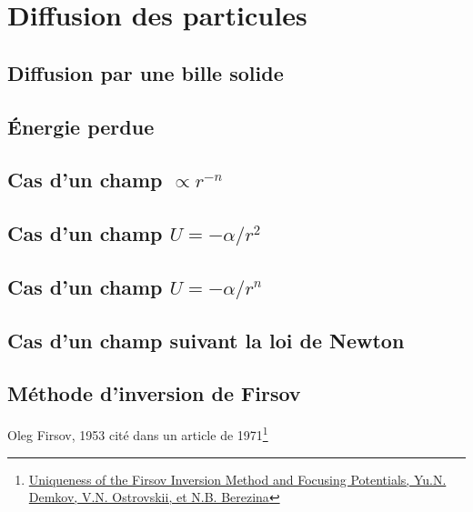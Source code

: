 \section{Diffusion des particules}

\subsection{Diffusion par une bille solide}

\subsection{\'Energie perdue}

\subsection{Cas d'un champ $\propto r^{-n}$}

\subsection{Cas d'un champ $U = -\alpha / r^{2}$}

\subsection{Cas d'un champ $U = -\alpha / r^{n}$}

\subsection{Cas d'un champ suivant la loi de Newton}

\subsection{M\'ethode d'inversion de Firsov}

Oleg Firsov, 1953 cit\'e dans un article de 1971\footnote{\href{https://www.researchgate.net/publication/241428121_Uniqueness_of_the_Firsov_Inversion_Method_and_Focusing_Potentials}{Uniqueness of the Firsov Inversion Method and Focusing Potentials, Yu.N. Demkov, V.N. Ostrovskii, et N.B. Berezina}}